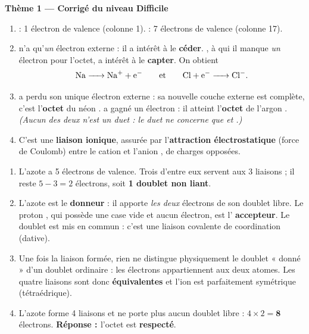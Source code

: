 \documentclass[11pt,a4paper]{article}
\newcommand{\rep}{\textbf{\textcolor{corcol}{Réponse : }}}
\begin{document}
\begin{center}
{\Large\bfseries\color{primarydark}Thème 1 — Corrigé du niveau Difficile}
\end{center}
\medskip

\begin{cor}
\begin{enumerate}[label=\alph*),leftmargin=2em,itemsep=2pt]
  \item {} : 1 électron de valence (colonne 1).  : 7 électrons de valence (colonne 17).
  \item {} n'a qu'\emph{un} électron externe : il a intérêt à le \textbf{céder}. , à
        qui il manque \emph{un} électron pour l'octet, a intérêt à le \textbf{capter}. On obtient
        \[ \ce{Na -> Na+ + e-}\qquad\text{et}\qquad \ce{Cl + e- -> Cl-}. \]
  \item {} a perdu son unique électron externe : sa nouvelle couche externe est complète,
        c'est l'\textbf{octet} du néon .  a gagné un électron : il atteint
        l'\textbf{octet} de l'argon . \emph{(Aucun des deux n'est un duet : le duet ne
        concerne que  et .)}
  \item C'est une \textbf{liaison ionique}, assurée par l'\textbf{attraction électrostatique}
        (force de Coulomb) entre le cation  et l'anion , de charges opposées.
\end{enumerate}
\end{cor}

\begin{cor}
\begin{enumerate}[label=\alph*),leftmargin=2em,itemsep=2pt]
  \item L'azote a 5 électrons de valence. Trois d'entre eux servent aux 3 liaisons  ; il
        reste $5-3 = 2$ électrons, soit \textbf{1 doublet non liant}.
  \item L'azote est le \textbf{donneur} : il apporte \emph{les deux} électrons de son doublet
        libre. Le proton , qui possède une case vide et aucun électron, est l'
        \textbf{accepteur}. Le doublet est mis en commun : c'est une liaison covalente de
        coordination (dative).
  \item Une fois la liaison formée, rien ne distingue physiquement le doublet « donné » d'un
        doublet ordinaire : les électrons appartiennent aux deux atomes. Les quatre liaisons
         sont donc \textbf{équivalentes} et l'ion  est parfaitement symétrique
        (tétraédrique).
  \item L'azote forme 4 liaisons et ne porte plus aucun doublet libre : $4\times 2 = \mathbf{8}$
        électrons. \rep l'octet est \textbf{respecté}.
\end{enumerate}
\end{cor}
\end{document}
